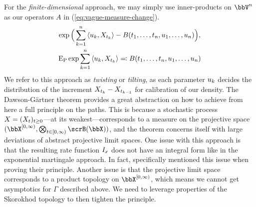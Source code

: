 For the \emph{finite-dimensional} approach, we may simply use inner-products on $\vecSpace^n$ as our operators $A$ in (\ref{eq:vague-measure-change}).
\begin{gather}
  \label{eq:vague-measure-change-fdd}
  \exp\Big( \sum_{k=1}^n {\langle u_k , X_{t_k} \rangle} - B(t_1, \ldots, t_n, u_1, \ldots, u_n) \Big),\\
  \notag
   {\operatorname{E}}_{\operatorname{P}}\exp\sum_{k=1}^n {\langle u_k , X_{t_k} \rangle} \eqqcolon B(t_1, \ldots, t_n, u_1, \ldots, u_n) 
\end{gather}
We refer to this approach as \emph{twisting} or \emph{tilting}, as each parameter $u_k$ decides the distribution of the increment $X_{t_k} - X_{t_{k-1}}$ for calibration of our density.
The Dawson-G\"artner theorem \cite[Theorem 4.6.1]{dembo2010} provides a great abstraction on how to achieve from here a full principle on the paths.
This is because a stochastic process $X=(X_t)_{t\geq0}$---at its weakest---corresponds to a measure on the projective space $(\stateSpace^{[0,\infty)}, \bigotimes_{t\in[0,\infty)}\scrB(\stateSpace))$, and the theorem concerns itself with large deviations of abstract projective limit spaces.
One issue with this approach is that the resulting rate function $I_x$ does not have an integral form like in the exponential martingale approach.
In fact, \cite{kang2014} specifically mentioned this issue when proving their principle.
Another issue is that the projective limit space corresponds to a product topology on $\stateSpace^{[0,\infty)}$, which means we cannot get asymptotics for $\Gamma$ described above.
We need to leverage properties of the Skorokhod topology to then tighten the principle.

